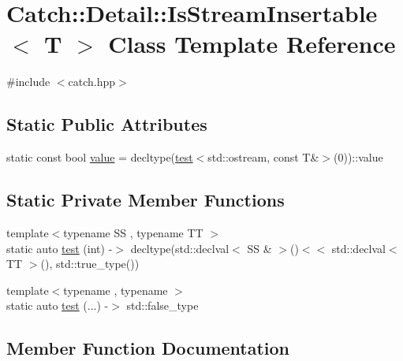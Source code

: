 \hypertarget{class_catch_1_1_detail_1_1_is_stream_insertable}{}\section{Catch\+::Detail\+::Is\+Stream\+Insertable$<$ T $>$ Class Template Reference}
\label{class_catch_1_1_detail_1_1_is_stream_insertable}


{\ttfamily \#include $<$catch.\+hpp$>$}

\subsection*{Static Public Attributes}
\begin{DoxyCompactItemize}
\item 
static const bool \mbox{\hyperlink{class_catch_1_1_detail_1_1_is_stream_insertable_a42818b09ae5851126a70ee263769e309}{value}} = decltype(\mbox{\hyperlink{class_catch_1_1_detail_1_1_is_stream_insertable_ac5981238a76d66e36b3d014aa870d15c}{test}}$<$std\+::ostream, const T\&$>$(0))\+::value
\end{DoxyCompactItemize}
\subsection*{Static Private Member Functions}
\begin{DoxyCompactItemize}
\item 
{\footnotesize template$<$typename SS , typename TT $>$ }\\static auto \mbox{\hyperlink{class_catch_1_1_detail_1_1_is_stream_insertable_ac5981238a76d66e36b3d014aa870d15c}{test}} (int) -\/$>$ decltype(std\+::declval$<$ SS \& $>$()$<$$<$ std\+::declval$<$ TT $>$(), std\+::true\+\_\+type())
\item 
{\footnotesize template$<$typename , typename $>$ }\\static auto \mbox{\hyperlink{class_catch_1_1_detail_1_1_is_stream_insertable_ac5761375646929916dc5e165d44cd3d9}{test}} (...) -\/$>$ std\+::false\+\_\+type
\end{DoxyCompactItemize}


\subsection{Member Function Documentation}
\mbox{\label{class_catch_1_1_detail_1_1_is_stream_insertable_ac5981238a76d66e36b3d014aa870d15c}} 
